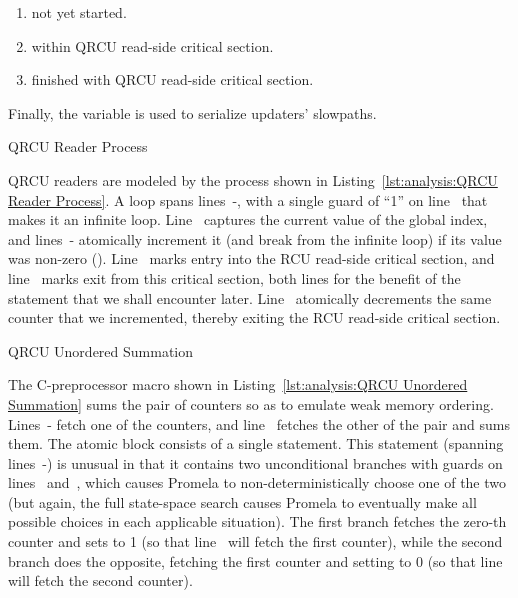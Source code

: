\begin{enumerate}[label={\arabic*}:,start=0,itemsep=0pt]
\item	not yet started.
\item	within QRCU read-side critical section.
\item	finished with QRCU read-side critical section.
\end{enumerate}

Finally, the  variable is used to serialize updaters' slowpaths.

\begin{listing}[htbp]

\caption{QRCU Reader Process}
\label{lst:analysis:QRCU Reader Process}
\end{listing}

\begin{lineref}
QRCU readers are modeled by the  process shown in
Listing~\ref{lst:analysis:QRCU Reader Process}.
A  loop spans lines~-,
with a single guard of ``1''
on line~ that makes it an infinite loop.
Line~ captures the current value of the global index,
and lines~-
atomically increment it (and break from the infinite loop)
if its value was non-zero ().
Line~ marks entry into the RCU read-side critical section, and
line~ marks exit from this critical section,
both lines for the benefit of
the  statement that we shall encounter later.
Line~ atomically decrements the same counter that we incremented,
thereby exiting the RCU read-side critical section.
\end{lineref}

\begin{listing}[htbp]

\caption{QRCU Unordered Summation}
\label{lst:analysis:QRCU Unordered Summation}
\end{listing}

\begin{lineref}
The C-preprocessor macro shown in
Listing~\ref{lst:analysis:QRCU Unordered Summation}
sums the pair of counters so as to emulate weak memory ordering.
Lines~- fetch one of the counters,
and line~ fetches the other
of the pair and sums them.
The atomic block consists of a single  statement.
This  statement (spanning lines~-) is unusual in that
it contains two unconditional
branches with guards on lines~ and~, which causes Promela to
non-deterministically choose one of the two (but again, the full
state-space search causes Promela to eventually make all possible
choices in each applicable situation).
The first branch fetches the zero-th counter and sets  to 1 (so
that line~ will fetch the first counter), while the second
branch does the opposite, fetching the first counter and setting 
to 0 (so that line~ will fetch the second counter).
\end{lineref}

